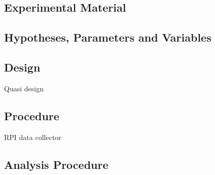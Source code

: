 \subsection{Experimental Material}

\subsection{Hypotheses, Parameters and Variables}


\subsection{Design}
Quasi design


\subsection{Procedure}
RPI data collector 

\subsection{Analysis Procedure}
